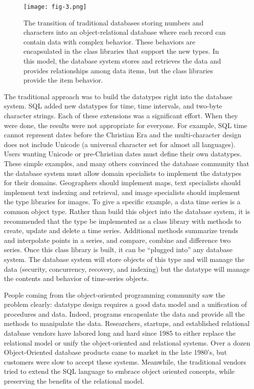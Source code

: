 \documentclass[a4paper,12pt,notitlepage,twoside,openright]{article}
\begin{document}
\begin{figure}
  \centering
  \texttt{[image: fig-3.png]}
  \caption{The transition of traditional databases storing numbers and
characters into an object-relational database where each record can
contain data with complex behavior. These behaviors are encapsulated in
the class libraries that support the new types. In this model, the
database system stores and retrieves the data and provides relationships
among data items, but the class libraries provide the item behavior.}
\end{figure}

The traditional approach was to build the datatypes right into the
database system. SQL added new datatypes for time, time intervals, and
two-byte character strings. Each of these extensions was a significant
effort. When they were done, the results were not appropriate for
everyone. For example, SQL time cannot represent dates before the
Christian Era and the multi-character design does not include Unicode (a
universal character set for almost all languages). Users wanting Unicode
or pre-Christian dates must define their own datatypes. These simple
examples, and many others convinced the database community that the
database system must allow domain specialists to implement the datatypes
for their domains. Geographers should implement maps, text specialists
should implement text indexing and retrieval, and image specialists
should implement the type libraries for images. To give a specific
example, a data time series is a common object type. Rather than build
this object into the database system, it is recommended that the type be
implemented as a class library with methods to create, update and delete
a time series. Additional methods summarize trends and interpolate
points in a series, and compare, combine and difference two series. Once
this class library is built, it can be ``plugged into'' any database
system. The database system will store objects of this type and will
manage the data (security, concurrency, recovery, and indexing) but the
datatype will manage the contents and behavior of time-series objects.

People coming from the object-oriented programming community saw the
problem clearly: datatype design requires a good data model and a
unification of procedures and data. Indeed, programs encapsulate the
data and provide all the methods to manipulate the data. Researchers,
startups, and established relational database vendors have labored long
and hard since 1985 to either replace the relational model or unify the
object-oriented and relational systems. Over a dozen Object-Oriented
database products came to market in the late 1980's, but customers were
slow to accept these systems. Meanwhile, the traditional vendors tried
to extend the SQL language to embrace object oriented concepts, while
preserving the benefits of the relational model.
\end{document}
